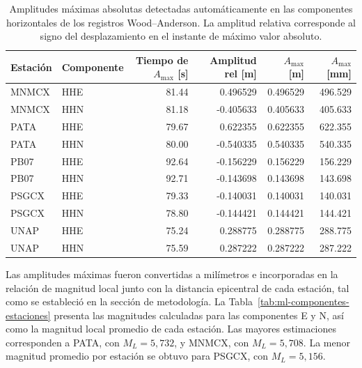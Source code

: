 \documentclass[a4paper,12pt]{article} %
\numberwithin{equation}{section} %
\numberwithin{figure}{section} %
\begin{document}
\begin{table}[htbp]
    \centering
    \caption{Amplitudes máximas absolutas detectadas automáticamente en las componentes horizontales de los registros Wood--Anderson. La amplitud relativa corresponde al signo del desplazamiento en el instante de máximo valor absoluto.}
    \label{tab:amplitudes-maximas-wa}
    \begin{tabular}{l l r r r r}
        \hline
        Estación & Componente & Tiempo de $A_{\max}$ [s] &
        Amplitud rel [m] & $A_{\max}$ [m] & $A_{\max}$ [mm] \\
        \hline
        MNMCX & HHE & 81.44 &  0.496529 & 0.496529 & 496.529 \\
        MNMCX & HHN & 81.18 & -0.405633 & 0.405633 & 405.633 \\
        PATA  & HHE & 79.67 &  0.622355 & 0.622355 & 622.355 \\
        PATA  & HHN & 80.00 & -0.540335 & 0.540335 & 540.335 \\
        PB07  & HHE & 92.64 & -0.156229 & 0.156229 & 156.229 \\
        PB07  & HHN & 92.71 & -0.143698 & 0.143698 & 143.698 \\
        PSGCX & HHE & 79.33 & -0.140031 & 0.140031 & 140.031 \\
        PSGCX & HHN & 78.80 & -0.144421 & 0.144421 & 144.421 \\
        UNAP  & HHE & 75.24 &  0.288775 & 0.288775 & 288.775 \\
        UNAP  & HHN & 75.59 &  0.287222 & 0.287222 & 287.222 \\
        \hline
    \end{tabular}
\end{table}

\clearpage
Las amplitudes máximas fueron convertidas a milímetros e incorporadas en la relación de magnitud local junto con la distancia epicentral de cada estación, tal como se estableció en la sección de metodología. La Tabla~\ref{tab:ml-componentes-estaciones} presenta las magnitudes calculadas para las componentes E y N, así como la magnitud local promedio de cada estación. Las mayores estimaciones corresponden a PATA, con \(M_L=5{,}732\), y MNMCX, con \(M_L=5{,}708\). La menor magnitud promedio por estación se obtuvo para PSGCX, con \(M_L=5{,}156\).
\end{document}

